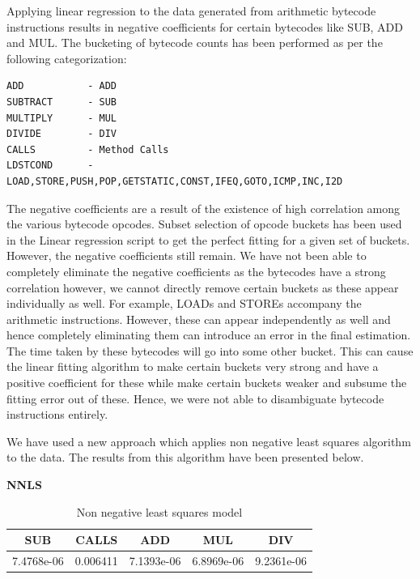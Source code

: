 \documentclass[11pt]{article}
\begin{document}
Applying linear regression to the data generated from arithmetic bytecode instructions results in negative coefficients for certain bytecodes like SUB, ADD and MUL. The bucketing of bytecode counts has been performed as per the following categorization:\\
\begin{lstlisting}
ADD           - ADD
SUBTRACT      - SUB
MULTIPLY      - MUL
DIVIDE        - DIV
CALLS         - Method Calls
LDSTCOND      - LOAD,STORE,PUSH,POP,GETSTATIC,CONST,IFEQ,GOTO,ICMP,INC,I2D
\end{lstlisting}

The negative coefficients are a result of the existence of high correlation among the various bytecode opcodes. Subset selection of opcode buckets has been used in the Linear regression script to get the perfect fitting for a given set of buckets. However, the negative coefficients still remain. We have not been able to completely eliminate the negative coefficients as the bytecodes have a strong correlation however, we cannot directly remove certain buckets as these appear individually as well. For example, LOADs and STOREs accompany the arithmetic instructions. However, these can appear independently as well and hence completely eliminating them can introduce an error in the final estimation. The time taken by these bytecodes will go into some other bucket. This can cause the linear fitting algorithm to make certain buckets very strong and have a positive coefficient for these while make certain buckets weaker and subsume the fitting error out of these. Hence, we were not able to disambiguate bytecode instructions entirely. 

We have used a new approach which applies non negative least squares algorithm to the data. The results from this algorithm have been presented below.

\textbf{NNLS} \newline
\begin{table}[h!]
\begin{center}
\begin{tabular}{|c|c|c|c|c|}
\hline
SUB&CALLS&ADD&MUL&DIV\\
\hline
7.4768e-06&0.006411&7.1393e-06&6.8969e-06&9.2361e-06 \\
\hline
\end{tabular}
\end{center}
\caption{Non negative least squares model}
\label{NNLS  results:2}
\end{table}
\end{document}
